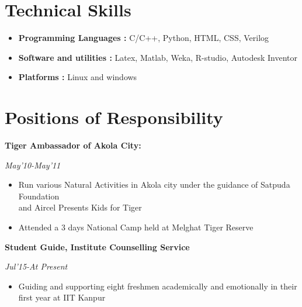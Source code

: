 \documentclass[14pt]{article} %
\begin{document}
\begin{itemize}
\section*{Technical Skills}
\begin{itemize}
\item {\bfseries Programming Languages :} C/C++, Python, HTML, CSS, Verilog
\vspace{-4pt}
\item {\bfseries Software and utilities :} Latex, Matlab, Weka, R-studio, Autodesk Inventor 
\vspace{-4pt}
\item {\bfseries Platforms :} Linux and windows
\vspace{-4pt}
\end{itemize}
\section*{Positions of Responsibility}
\begin{itemize}
\begin{minipage}[ht]{0.78 \textwidth}
\item{\bfseries Tiger Ambassador of Akola City:} \end{minipage}
\vspace{-7pt}
\begin{minipage}{0.14\textwidth}
\textit{May'10-May'11}
\end{minipage}
\begin{itemize}
\item Run various Natural Activities in Akola city under the guidance of Satpuda Foundation\\ and Aircel Presents Kids for Tiger
\hspace{-4pt}
\item Attended a 3 days National Camp held at Melghat Tiger Reserve  
\end{itemize}
\vspace{-7pt}
\begin{minipage}{0.78\textwidth}
\item{\bfseries Student Guide, Institute Counselling Service } 
\end{minipage}
\begin{minipage}{0.14\textwidth}
\textit{Jul'15-At Present} 
\end{minipage}
\vspace{-7pt}
\begin{itemize}
\item Guiding and supporting eight freshmen academically and emotionally in their first year at IIT Kanpur

\end{itemize}
\end{itemize}
\end{itemize}
\end{document}
